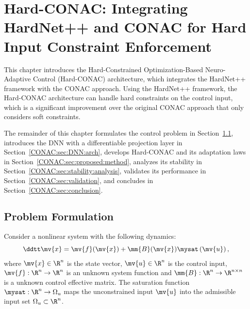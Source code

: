\newcommand{\zoomStartTime}{24.6}
\newcommand{\zoomEndTime}{25.3}
\newcommand{\resultFig}{figs/CONAC_figs}

\chapter{Hard-CONAC: Integrating HardNet++ and CONAC for Hard Input Constraint Enforcement}
\label{CONAC:chap:hard:CONAC}

This chapter introduces the Hard-Constrained Optimization-Based Neuro-Adaptive Control (Hard-CONAC) architecture, which integrates the HardNet++ framework with the CONAC approach.
Using the HardNet++ framework, the Hard-CONAC architecture can handle hard constraints on the control input, which is a significant improvement over the original CONAC approach that only considers soft constraints.

The remainder of this chapter formulates the control problem in Section~\ref{CONAC:sec:problem:formulation}, introduces the DNN with a differentiable projection layer in Section~\ref{CONAC:sec:DNN:arch}, develops Hard-CONAC and its adaptation laws in Section~\ref{CONAC:sec:proposed:method}, analyzes its stability in Section~\ref{CONAC:sec:stability:analysis}, validates its performance in Section~\ref{CONAC:sec:validation}, and concludes in Section~\ref{CONAC:sec:conclusion}.

\section{Problem Formulation}
\label{CONAC:sec:problem:formulation}

Consider a nonlinear system with the following dynamics:
\begin{equation}
  \label{CONAC:eq:sys}
  \ddtt\mv{x}
  =
  \mv{f}(\mv{x})
  +
  \mm{B}(\mv{x})
  \mysat
  \left(
    \mv{u}
  \right)
  ,
\end{equation}
where $\mv{x} \in \R^{n}$ is the state vector, $\mv{u} \in \R^{n}$ is the control input, $\mv{f}:\R^n\to\R^n$ is an unknown system function and $\mm{B}:\R^n\to\R^{n\times n}$ is a unknown control effective matrix.
The saturation function $\mysat:\R^n\to\Omega_u$ maps the unconstrained input $\mv{u}$ into the admissible input set $\Omega_u\subset\R^n$.

